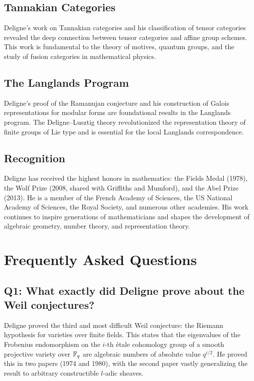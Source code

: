 \subsection{Tannakian Categories}

Deligne's work on Tannakian categories and his classification of tensor categories revealed the deep connection between tensor categories and affine group schemes. This work is fundamental to the theory of motives, quantum groups, and the study of fusion categories in mathematical physics.

\subsection{The Langlands Program}

Deligne's proof of the Ramanujan conjecture and his construction of Galois representations for modular forms are foundational results in the Langlands program. The Deligne--Lusztig theory revolutionized the representation theory of finite groups of Lie type and is essential for the local Langlands correspondence.

\subsection{Recognition}

Deligne has received the highest honors in mathematics: the Fields Medal (1978), the Wolf Prize (2008, shared with Griffiths and Mumford), and the Abel Prize (2013). He is a member of the French Academy of Sciences, the US National Academy of Sciences, the Royal Society, and numerous other academies. His work continues to inspire generations of mathematicians and shapes the development of algebraic geometry, number theory, and representation theory.

\section{Frequently Asked Questions}

\subsection*{Q1: What exactly did Deligne prove about the Weil conjectures?}

Deligne proved the third and most difficult Weil conjecture: the Riemann hypothesis for varieties over finite fields. This states that the eigenvalues of the Frobenius endomorphism on the \(i\)-th \'etale cohomology group of a smooth projective variety over \(\mathbb{F}_q\) are algebraic numbers of absolute value \(q^{i/2}\). He proved this in two papers (1974 and 1980), with the second paper vastly generalizing the result to arbitrary constructible \(l\)-adic sheaves.


